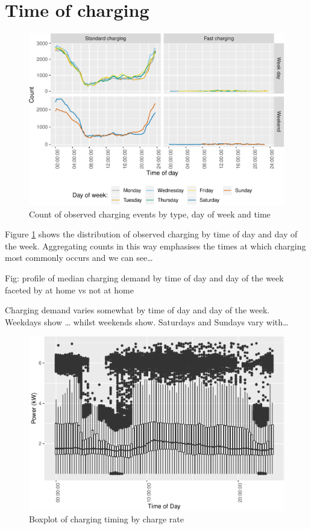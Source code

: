 \documentclass[]{article}
\begin{document}
\section{Time of charging}\label{time-of-charging}

\begin{figure}
\centering
\includegraphics{EVBB_report_files/figure-latex/chargeTime-1.pdf}
\caption{\label{fig:chargeTime}Count of observed charging events by type,
day of week and time}
\end{figure}

Figure \ref{fig:chargeTime} shows the distribution of observed charging
by time of day and day of the week. Aggregating counts in this way
emphasises the times at which charging most commonly occurs and we can
see\ldots{}

Fig: profile of median charging demand by time of day and day of the
week faceted by at home vs not at home

Charging demand varies somewhat by time of day and day of the week.
Weekdays show \ldots{} whilst weekends show. Saturdays and Sundays vary
with\ldots{}

\begin{figure}
\centering
\includegraphics{EVBB_report_files/figure-latex/boxplotCharging-1.pdf}
\caption{\label{fig:boxplotCharging}Boxplot of charging timing by charge
rate}
\end{figure}
\end{document}
